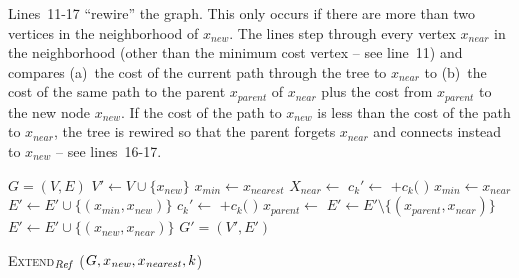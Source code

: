 \documentclass[conference]{IEEEtran}
\begin{document}
Lines~11-17 ``rewire'' the graph.  
This only occurs if there are more than two vertices in the neighborhood of $x_{new}$.  
The lines step through every vertex $x_{near}$ in the neighborhood (other than the minimum cost vertex -- see line~11) and compares (a)~the cost of the current path through the tree to $x_{near}$ to (b)~the cost of the same path to the parent $x_{parent}$ of $x_{near}$ plus the cost from $x_{parent}$ to the new node $x_{new}$. 
If the cost of the path to $x_{new}$ is less than the cost of the path to $x_{near}$, the tree is rewired so that the parent forgets $x_{near}$ and connects instead to $x_{new}$ -- see lines~16-17.

\begin{algorithm}[hbtp]
\begin{algorithmic}[1]
	\Return $G=(V,E)$ 
\EndIf
\State $ V' \leftarrow V \cup \{ x_{new} \} $
\State $ x_{min} \leftarrow x_{nearest} $
\State $ X_{near} \leftarrow $ 
			\State $ c_{k}' \leftarrow $  $ + c_{k}( $  $ ) $ 
			\State $ x_{min} \leftarrow x_{near} $
			\EndIf
		\EndIf
	\EndFor
	\State $ E' \leftarrow E' \cup \{ ( x_{min}, x_{new} ) \} $
{}
	    \State $ c_{k}' \leftarrow $  $ + c_{k}( $  $ ) $ 
			\State $ x_{parent} \leftarrow $ 
			\State $ E' \leftarrow E' \setminus \{ ( x_{parent}, x_{near} ) \} $
			\State $ E' \leftarrow E' \cup \{ ( x_{new}, x_{near} ) \} $
		\EndIf
	\EndIf
\EndFor
\Return $ G' = (V', E') $ 
\end{algorithmic}
\caption{ \textsc{Extend}$_{\it Ref} $ ($ G, x_{\it new}, x_{\it nearest},k$) }
\label{alg:morrtstar:extend:ref}
\end{algorithm} 
\end{document}
